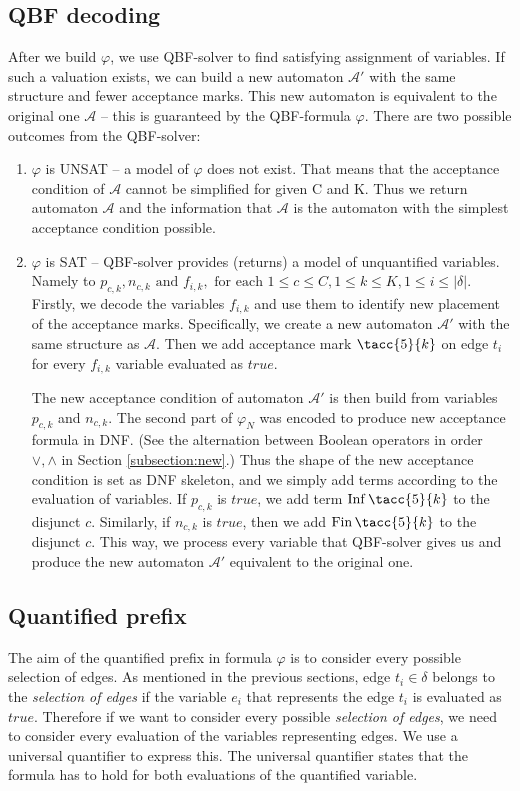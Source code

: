 \documentclass[a4paper,UKenglish,cleveref, autoref, thm-restate]{lipics-v2021}
\DeclareMathOperator{\Inf}{\mathsf{Inf}}
\DeclareMathOperator{\Fin}{\mathsf{Fin}}
\def\true{\mathit{true}}
\begin{document}
\subsection{QBF decoding}
After we build $\varphi$, we use QBF-solver to find satisfying assignment of variables. If such a valuation exists, we can build a new automaton $\mathcal{A}'$ with the same structure and fewer acceptance marks. This new automaton is equivalent to the original one $\mathcal{A}$ -- this is guaranteed by the QBF-formula $\varphi$. 
There are two possible outcomes from the QBF-solver:
\begin{enumerate}
    \item $\varphi$ is UNSAT -- a model of $\varphi$ does not exist. That means that the acceptance condition of $\mathcal{A}$ cannot be simplified for given C and K. Thus we return automaton $\mathcal{A}$ and the information that $\mathcal{A}$ is the automaton with the simplest acceptance condition possible.
    \item $\varphi$ is SAT -- QBF-solver provides (returns) a model of unquantified variables. Namely to $p_{c, k},n_{c,k} \text{ and } f_{i,k}, \text{ for each }1 \leq c \leq C, 1 \leq k \leq K, 1 \leq i \leq |\delta|$.
    Firstly, we decode the variables $f_{i,k}$ and use them to identify new placement of the acceptance marks. Specifically, we create a new automaton $\mathcal{A}'$ with the same structure as $\mathcal{A}$. Then  we add acceptance mark $\tacc{5}{k}$ on edge $t_{i}$ for every $f_{i,k}$ variable evaluated as $\true$. 
    
    The new acceptance condition of automaton $\mathcal{A}'$ is then build from variables $p_{c,k}$ and $n_{c,k}$. The second part of $\varphi_{N}$ was encoded to produce new acceptance formula in DNF. (See the alternation between Boolean operators  in order $\lor, \land$ in Section \ref{subsection:new}.) Thus the shape of the new acceptance condition is set as DNF skeleton, and we simply add terms according to the evaluation of variables. If $p_{c,k}$ is $\true$, we add term $\Inf\tacc{5}{k}$ to the disjunct $c$. Similarly, if $n_{c,k}$ is $\true$, then we add $\Fin\tacc{5}{k}$ to the disjunct $c$. This way, we process every variable that QBF-solver gives us and produce the new automaton $\mathcal{A}'$
    equivalent to the original one.
    
\end{enumerate}

\subsection{Quantified prefix}
\label{subsection:quant_pref}
The aim of the quantified prefix in formula $\varphi$ is to consider every possible selection of edges. As mentioned in the previous sections, edge $t_{i} \in \delta$ belongs to the \emph{selection of edges} if the variable $e_{i}$ that represents the edge $t_{i}$ is evaluated as $\true$. Therefore if we want to consider every possible \emph{selection of edges}, we need to consider every evaluation of the variables representing edges. We use a universal quantifier to express this. The universal quantifier states that the formula has to hold for both evaluations of the quantified variable.
\end{document}
